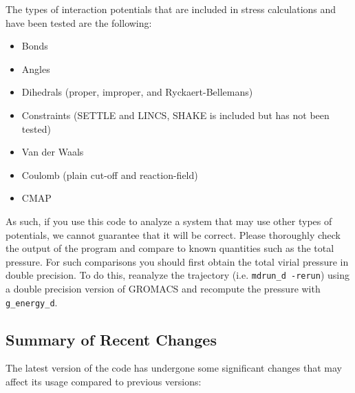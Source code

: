 \documentclass[10pt,letterpaper,notitlepage]{article}
\begin{document}
The types of interaction potentials that are included in stress calculations and have been tested are the following:

\begin{itemize}
	\item Bonds
	\item Angles
	\item Dihedrals (proper, improper, and Ryckaert-Bellemans)
	\item Constraints (SETTLE and LINCS, SHAKE is included but has not been tested)
	\item Van der Waals
	\item Coulomb (plain cut-off and reaction-field) 
	\item CMAP
\end{itemize}

As such, if you use this code to analyze a system that may use other types of potentials, we cannot guarantee that it will be correct. Please thoroughly check the output of the program and compare to known quantities such as the total pressure. For such comparisons you should first obtain the total virial pressure in double precision. To do this, reanalyze the trajectory (i.e. \texttt{mdrun\_d -rerun}) using a double precision version of GROMACS and recompute the pressure with \texttt{g\_energy\_d}. 

\subsection{Summary of Recent Changes}

The latest version of the code has undergone some significant changes that may affect its usage compared to previous versions:
\end{document}
